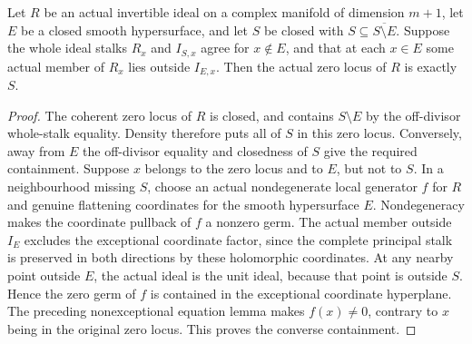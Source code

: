\begin{lemma}
\label{hir:invertible-ideal-support-across-smooth-divisor}
\leanok
Let $R$ be an actual invertible ideal on a complex manifold of dimension
$m+1$, let $E$ be a closed smooth hypersurface, and let $S$ be closed
with $S\subseteq\overline{S\setminus E}$.  Suppose the whole ideal
stalks $R_x$ and $I_{S,x}$ agree for $x\notin E$, and that at each
$x\in E$ some actual member of $R_x$ lies outside $I_{E,x}$.
Then the actual zero locus of $R$ is exactly $S$.
\end{lemma}
\begin{proof}
The coherent zero locus of $R$ is closed, and contains $S\setminus E$
by the off-divisor whole-stalk equality.  Density therefore puts all of
$S$ in this zero locus.
Conversely, away from $E$ the off-divisor equality and closedness of $S$
give the required containment.  Suppose $x$ belongs to the zero locus
and to $E$, but not to $S$.  In a neighbourhood missing $S$, choose an
actual nondegenerate local generator $f$ for $R$ and genuine flattening
coordinates for the smooth hypersurface $E$.  Nondegeneracy makes the
coordinate pullback of $f$ a nonzero germ.  The actual member outside
$I_E$ excludes the exceptional coordinate factor, since the complete
principal stalk is preserved in both directions by these holomorphic
coordinates.  At any nearby point outside $E$, the actual ideal is the
unit ideal, because that point is outside $S$.  Hence the zero germ of
$f$ is contained in the exceptional coordinate hyperplane.  The preceding
nonexceptional equation lemma makes $f(x)\ne0$, contrary to $x$ being
in the original zero locus.  This proves the converse containment.
\end{proof}

